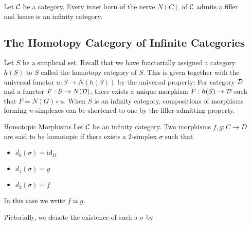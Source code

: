 \documentclass[a4paper]{article}
\begin{document}
\begin{thm}{}{} Let $\mathcal{C}$ be a category. Every inner horn of the nerve $N(C)$ of $\mathcal{C}$ admits a filler and hence is an infinity category. 
\end{thm}

\subsection{The Homotopy Category of Infinite Categories}
Let $S$ be a simplicial set. Recall that we have functorially assigned a category $h(S)$ to $S$ called the homotopy category of $S$. This is given together with the universal functor $u:S\to N(h(S))$ by the universal property: For category $\mathcal{D}$ and a functor $F:S\to N(\mathcal{D})$, there exists a unique morphism $F:h(S)\to\mathcal{D}$ such that $F=N(G)\circ u$. When $S$ is an infinity category, compositions of morphisms forming $n$-simplexes can be shortened to one by the filler-admitting property. 

\begin{defn}{Homotopic Morphisms}{} Let $\mathcal{C}$ be an infinity category. Two morphisms $f,g:C\to D$ are said to be homotopic if there exists a $2$-simplex $\sigma$ such that 
\begin{itemize}
\item $d_0(\sigma)=\text{id}_D$
\item $d_1(\sigma)=g$
\item $d_2(\sigma)=f$
\end{itemize}
In this case we write $f\simeq g$. 
\end{defn}

Pictorially, we denote the existence of such a $\sigma$ by \\~\\
\\~\\
\end{document}

